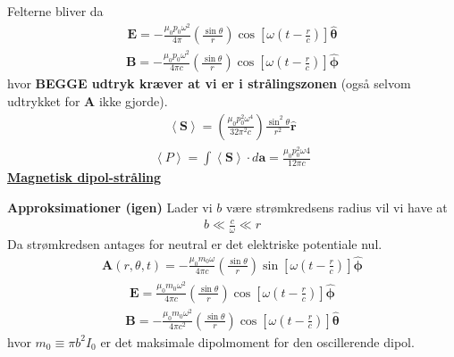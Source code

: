 \documentclass[a4paper]{article}
\begin{document}
    Felterne bliver da \begin{align*}
        \boxed{\mathbf{E} = -\frac{\mu _0 p_0 \omega ^{2} }{4 \pi } \left( \frac{\sin  \theta }{r} \right) \cos \left[ \omega (t - \frac{r}{c}) \right] \hat{\boldsymbol{\theta}}} \tag{11.18}
    \end{align*}
    \begin{align*}
        \boxed{\mathbf{B} = -\frac{\mu _0 p_0 \omega ^{2} }{4 \pi c} \left( \frac{\sin  \theta }{r} \right) \cos \left[ \omega (t - \frac{r}{c}) \right] \hat{\boldsymbol{\phi }}} \tag{11.19}
    \end{align*}
    hvor \textbf{BEGGE udtryk kræver at vi er i strålingszonen} (også selvom udtrykket for \(\mathbf{A}\) ikke gjorde). 
    \begin{align*}
        \left\langle \mathbf{S} \right\rangle = \left( \frac{\mu _0 p_0 ^2 \omega ^4}{32 \pi^{2} c} \right) \frac{\sin ^{2} \theta }{r^{2} } \hat{\mathbf{r}} \tag{11.21}
    \end{align*}
    \begin{align*}
        \left\langle P \right\rangle = \int \left\langle \mathbf{S} \right\rangle \cdot d \mathbf{a} = \frac{\mu _0 p_0 ^{2} \omega 
        4}{12 \pi  c} \tag{11.22}
    \end{align*}
    \underline{\textbf{Magnetisk dipol-stråling}}

    \textbf{Approksimationer (igen)} 
    Lader vi \(b\) være strømkredsens radius vil vi have at \begin{align*}
        b \ll \frac{c}{\omega } \ll r
    \end{align*} 
    Da strømkredsen antages for neutral er det elektriske potentiale nul. \begin{align*}
        \mathbf{A}(r, \theta , t) = - \frac{\mu _0 m_0 \omega }{4 \pi c} \left( \frac{\sin \theta }{r} \right) \sin \left[ \omega (t - \frac{r}{c}) \right] \boldsymbol{\hat{\phi}} \tag{11.36}
    \end{align*}
    \begin{align*}
        \boxed{\mathbf{E} = \frac{\mu _0 m_0 \omega^{2}  }{4 \pi c} \left( \frac{\sin \theta }{r} \right) \cos \left[ \omega (t - \frac{r}{c}) \right] \boldsymbol{\hat{\phi}}} \tag{11.36}
    \end{align*} 
    \begin{align*}
       \boxed{\mathbf{B} = -\frac{\mu _0 m_0 \omega ^{2} }{4 \pi  c^{2} } \left( \frac{\sin  \theta }{r} \right) \cos \left[ \omega (t - \frac{r}{c}) \right] \hat{\boldsymbol{\theta}}} \tag{11.37}
    \end{align*}
    hvor \(m_0 \equiv \pi  b^{2} I_0\) er det maksimale dipolmoment for den oscillerende dipol.
\end{document}
